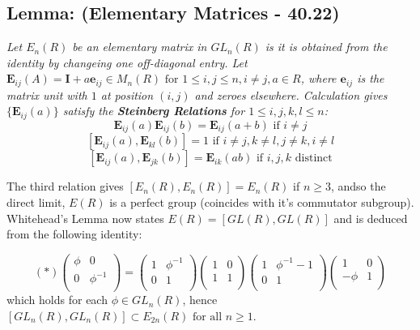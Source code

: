 \subsection{Lemma: (Elementary Matrices - \cite{CR} 40.22) \label{elementary}}
\emph{Let $E_n(R)$ be an elementary matrix in $GL_n(R)$ is it is obtained from the identity by changeing one off-diagonal entry. Let  $\mathbf E_{ij}(A) = \mathbf I + a \mathbf e_{ij}\in M_n(R) \text{  for } 1\leq i,j\leq n, i\neq j, a\in R$, where $\mathbf e_{ij}$ is the matrix unit with $1$ at position $(i,j)$ and zeroes elsewhere. Calculation gives $\{ \mathbf E_{ij}(a) \}$ satisfy the \textbf{Steinberg Relations} for $1\leq i,j,k,l \leq n$:}
$$\mathbf E_{ij}(a) \mathbf E_{ij}(b) = \mathbf E_{ij}(a+b)     \text{ if } i\neq j $$
$$ [\mathbf E_{ij}(a), \mathbf E_{kl}(b) ] = 1                                 \text{ if } i\neq j, k\neq l , j\neq k, i\neq l$$
$$ [\mathbf E_{ij}(a), \mathbf E_{jk}(b) ] = \mathbf E_{ik}(ab)  \text{ if } i,j,k \text{ distinct}$$

The third relation gives $[E_n(R), E_n(R)] = E_n(R)$  if $n\geq 3$, andso the direct limit, $E(R)$ is a perfect group (coincides with it's commutator subgroup). Whitehead's Lemma now states $E(R) = [GL(R), GL(R)]$ and is deduced from the following identity:

$$(*) \left( \begin{array}{cc}
\phi & 0\\
0 & \phi ^{-1}\\ \end{array}\right)
= 
\left( \begin{array}{cc}
1 & \phi^{-1}\\
0 & 1\\ \end{array}\right)
\left( \begin{array}{cc}
1 & 0\\
1 & 1\\ \end{array}\right)
\left( \begin{array}{cc}
1 & \phi^{-1} - 1\\
0 & 1\\ \end{array}\right)
\left( \begin{array}{cc}
1 & 0\\
-\phi & 1\\ \end{array}\right)$$
which holds for each $\phi\in GL_n(R)$, hence $[GL_n(R), GL_n(R)]\subset E_{2n}(R) \text{ for all } n\geq 1$.



